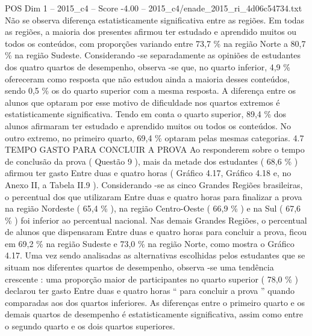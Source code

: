 \begin{textsample}{POS Dim 1 – 2015\_c4 – Score -4.00 – 2015\_c4/enade\_2015\_ri\_4d06c54734.txt}
Não se observa diferença estatisticamente significativa entre as regiões.
Em todas as regiões, a maioria dos presentes afirmou ter estudado e aprendido muitos ou todos os conteúdos, com proporções variando entre 73,7 \% na região Norte a 80,7 \% na região Sudeste.
Considerando -se separadamente as opiniões de estudantes dos quatro quartos de desempenho, observa -se que, no quarto inferior, 4,9 \% ofereceram como resposta que não estudou ainda a maioria desses conteúdos, sendo 0,5 \% os do quarto superior com a mesma resposta.
A diferença entre os alunos que optaram por esse motivo de dificuldade nos quartos extremos é estatisticamente significativa.
Tendo em conta o quarto superior, 89,4 \% dos alunos afirmaram ter estudado e aprendido muitos ou todos os conteúdos.
No outro extremo, no primeiro quarto, 69,4 \% optaram pelas mesmas categorias. 4.7 TEMPO GASTO PARA CONCLUIR A PROVA Ao responderem sobre o tempo de conclusão da prova ( Questão 9 ), mais da metade dos estudantes ( 68,6 \% ) afirmou ter gasto Entre duas e quatro horas ( Gráfico 4.17, Gráfico 4.18 e, no Anexo II, a Tabela II.9 ).
Considerando -se as cinco Grandes Regiões brasileiras, o percentual dos que utilizaram Entre duas e quatro horas para finalizar a prova na região Nordeste ( 65,4 \% ), na região Centro-Oeste ( 66,9 \% ) e na Sul ( 67,6 \% ) foi inferior ao percentual nacional.
Nas demais Grandes Regiões, o percentual de alunos que dispensaram Entre duas e quatro horas para concluir a prova, ficou em 69,2 \% na região Sudeste e 73,0 \% na região Norte, como mostra o Gráfico 4.17.
Uma vez sendo analisadas as alternativas escolhidas pelos estudantes que se situam nos diferentes quartos de desempenho, observa -se uma tendência crescente : uma proporção maior de participantes no quarto superior ( 78,0 \% ) declarou ter gasto Entre duas e quatro horas “ para concluir a prova ” quando comparadas aos dos quartos inferiores.
As diferenças entre o primeiro quarto e os demais quartos de desempenho é estatisticamente significativa, assim como entre o segundo quarto e os dois quartos superiores.

\end{textsample}
